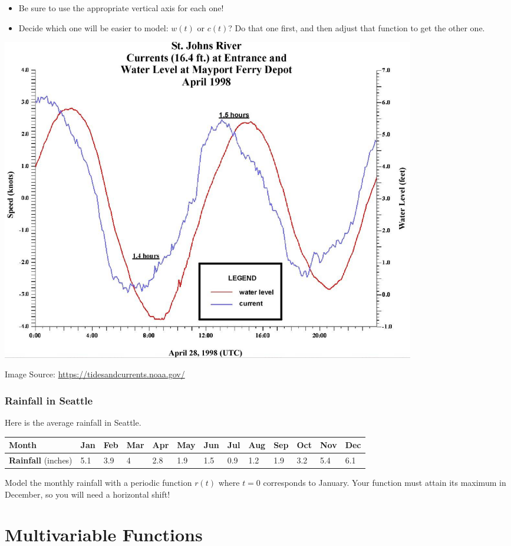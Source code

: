 \documentclass[
]{book}
\providecommand{\tightlist}{%
  \setlength{\itemsep}{0pt}\setlength{\parskip}{0pt}}
\begin{document}
\begin{itemize}
\tightlist
\item
  Be sure to use the appropriate vertical axis for each one!
\item
  Decide which one will be easier to model: \(w(t)\) or \(c(t)\)? Do that one first, and then adjust that function to get the other one.
\end{itemize}

\includegraphics[width=0.8\textwidth,height=\textheight]{images/tidevscurrentstjohns.jpeg}

Image Source: \url{https://tidesandcurrents.noaa.gov/}

\hypertarget{rainfall-in-seattle}{%
\subsection{Rainfall in Seattle}\label{rainfall-in-seattle}}

Here is the average rainfall in Seattle.

\begin{longtable}[]{@{}lllllllllllll@{}}
\toprule
\textbf{Month} & Jan & Feb & Mar & Apr & May & Jun & Jul & Aug & Sep & Oct & Nov & Dec\tabularnewline
\midrule
\endhead
\textbf{Rainfall} (inches) & 5.1 & 3.9 & 4 & 2.8 & 1.9 & 1.5 & 0.9 & 1.2 & 1.9 & 3.2 & 5.4 & 6.1\tabularnewline
\bottomrule
\end{longtable}

Model the monthly rainfall with a periodic function \(r(t)\) where \(t=0\) corresponds to January. Your function must attain its maximum in December, so you will need a horizontal shift!

\hypertarget{multivariable-functions}{%
\chapter{Multivariable Functions}\label{multivariable-functions}}
\end{document}
